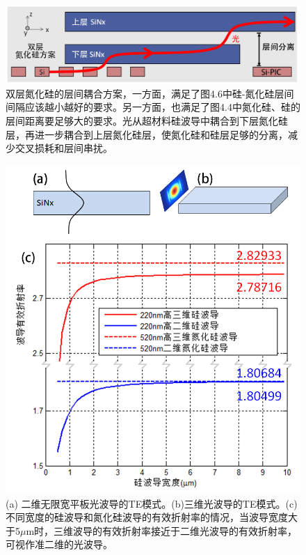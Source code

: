 \begin{figure}[!htbp]
    \centering
    \includegraphics[width=1\textwidth]{Img/4-7.png}
    \caption{双层氮化硅的层间耦合方案，一方面，满足了图4.6中硅-氮化硅层间间隔应该越小越好的要求。另一方面，也满足了图4.4中氮化硅、硅的层间距离要足够大的要求。光从超材料硅波导中耦合到下层氮化硅层，再进一步耦合到上层氮化硅层，使氮化硅和硅层足够的分离，减少交叉损耗和层间串扰。}
    \label{fig:4-7}
\end{figure}

\begin{figure}[!htbp]
    \centering
    \includegraphics[width=1\textwidth]{Img/4-8.png}
    \caption{(a) 二维无限宽平板光波导的TE模式。(b)三维光波导的TE模式。(c)不同宽度的硅波导和氮化硅波导的有效折射率的情况，当波导宽度大于5$\mu$m时，三维波导的有效折射率接近于二维光波导的有效折射率，可视作准二维的光波导。}
    \label{fig:4-8}
\end{figure}

